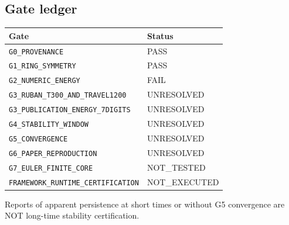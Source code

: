 \subsection*{Gate ledger}
\begin{tabular}{ll}\toprule Gate & Status \\ \midrule
\texttt{G0\_PROVENANCE} & PASS\\
\texttt{G1\_RING\_SYMMETRY} & PASS\\
\texttt{G2\_NUMERIC\_ENERGY} & FAIL\\
\texttt{G3\_RUBAN\_T300\_AND\_TRAVEL1200} & UNRESOLVED\\
\texttt{G3\_PUBLICATION\_ENERGY\_7DIGITS} & UNRESOLVED\\
\texttt{G4\_STABILITY\_WINDOW} & UNRESOLVED\\
\texttt{G5\_CONVERGENCE} & UNRESOLVED\\
\texttt{G6\_PAPER\_REPRODUCTION} & UNRESOLVED\\
\texttt{G7\_EULER\_FINITE\_CORE} & NOT\_TESTED\\
\texttt{FRAMEWORK\_RUNTIME\_CERTIFICATION} & NOT\_EXECUTED\\
\bottomrule\end{tabular}
\par\smallskip\noindent Reports of apparent persistence at short times or without G5 convergence are NOT long-time stability certification.\par
